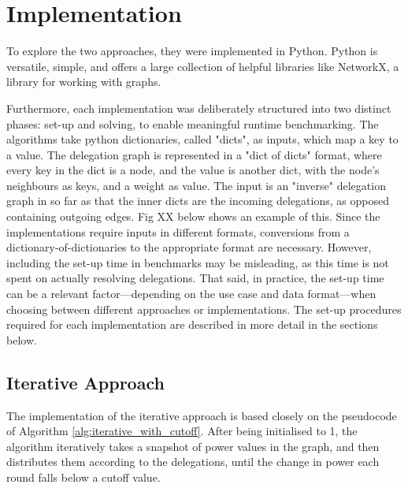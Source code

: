 
\chapter{Implementation}

To explore the two approaches, they were implemented in Python. Python is versatile, simple, and offers a large collection of helpful libraries like NetworkX, a library for working with graphs. 

Furthermore, each implementation was deliberately structured into two distinct phases: set-up and solving, to enable meaningful runtime benchmarking. The algorithms take python dictionaries, called "dicts", as inputs, which map a key to a value.  The delegation graph is represented in a "dict of dicts" format, where every key in the dict is a node, and the value is another dict, with the node's neighbours as keys, and a weight as value. The input is an "inverse" delegation graph in so far as that the inner dicts are the incoming delegations, as opposed containing outgoing edges. Fig XX below shows an example of this. Since the implementations require inputs in different formats, conversions from a dictionary-of-dictionaries to the appropriate format are necessary. However, including the set-up time in benchmarks may be misleading, as this time is not spent on actually resolving delegations. That said, in practice, the set-up time can be a relevant factor—depending on the use case and data format—when choosing between different approaches or implementations. The set-up procedures required for each implementation are described in more detail in the sections below.



\section{Iterative Approach}

The implementation of the iterative approach is based closely on the pseudocode of Algorithm \ref{alg:iterative_with_cutoff}. After being initialised to 1, the algorithm iteratively takes a snapshot of power values in the graph, and then distributes them according to the delegations, until the change in power each round falls below a cutoff value. 

